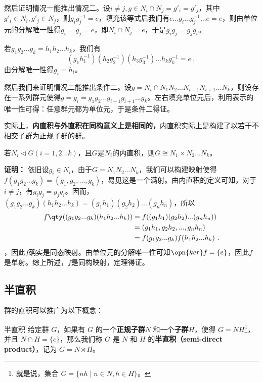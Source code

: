 然后证明情况一能推出情况二。设$i\neq j,g\in N_i\cap N_j=g'_i=g'_j$，其中$g'_i\in N_i,g'_j\in N_j$，则$g_ig_j^{-1}=e$，填充该等式后我们有$e...g_i...g_j^{-1}...e=e$，则由单位元的分解唯一性得$g_i=g_j=e$，即$N_i\cap N_j=e$，于是$g_ig_j=g_jg_i$。


若$g_1g_2...g_k=h_1h_2...h_k$，我们有
\begin{equation}
(g_1h_1^{-1})(h_2g_2^{-1})(h_3g_3^{-1})...h_kg_k^{-1}=e~,
\end{equation}
由分解唯一性得$g_i=h_i$。

然后我们来证明情况二能推出条件二。设$g=N_i\cap N_1N_2...N_{i-1}N_{i+1}...N_k$，则设存在一系列群元使得$g=g_i=g_1g_2...g_{i-1}g_{i+1}...g_k$。左右填充单位元后，利用表示的唯一性可得：任意群元都为单位元，于是条件二得证。


实际上，\textbf{内直积与外直积在同构意义上是相同的，}内直积实际上是构建了以若干不相交子群为正规子群的群。
\begin{theorem}{}
若$N_i\triangleleft G(i=1,2...k)$，且$G$是$N_i$的内直积，则$G\cong N_1\times N_2...N_k$。
\end{theorem}
\textbf{证明：}
依旧设$g_i\in N_i$，由于$G=N_1N_2...N_k$，我们可以构建映射使得$f(g_1g_2...g_k)=(g_1,g_2,...,g_k)$，易见这是一个满射。由内直积的定义可知，对于$i\neq j$，有$g_ig_j=g_jg_i$。因而，$(g_1g_2...g_k)(h_1h_2...h_k)=(g_1h_1)(g_2h_2)...(g_nh_n)$，所以
\begin{equation}
\begin{aligned}
f\qty((g_1g_2...g_k)(h_1h_2...h_k))&=f((g_1h_1)(g_2h_2)...(g_nh_n))\\
&=(g_1h_1,g_2h_2,...,g_nh_n)\\
&=f(g_1g_2...g_k)f(h_1h_2...h_k)~.
\end{aligned}
\end{equation}
，因此$f$确实是同态映射。由单位元的分解唯一性可知$\opn{ker}f=\{e\}$，因此$f$是单射。综上所述，$f$是同构映射，定理得证。


\subsection{半直积}

群的直积可以推广为以下概念：

\begin{definition}{半直积}
给定群 $G$，如果有 $G$ 的一个\textbf{正规子群}$N$ 和一个\textbf{子群}$H$，使得 $G = N H$\footnote{就是说，集合 $G= \{n h \mid n \in N, h\in H\}$。}，并且 $N \cap H = \{e\}$，那么我们称 $G$ 是 $N$ 和 $H$ 的\textbf{半直积（semi-direct product）}，记为 $G = N \rtimes H$。
\end{definition}

